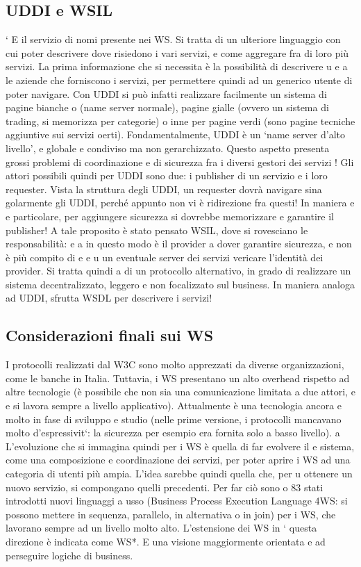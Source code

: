 \subsection{UDDI e WSIL}
`
E il servizio di nomi presente nei WS. Si tratta di un ulteriore linguaggio con
cui poter descrivere dove risiedono i vari servizi, e come aggregare fra di loro
più servizi. La prima informazione che si necessita è la possibilità di descrivere
u
e
a
le aziende che forniscono i servizi, per permettere quindi ad un generico utente
di poter navigare.
Con UDDI si può infatti realizzare facilmente un sistema di pagine bianche
o
(name server normale), pagine gialle (ovvero un sistema di trading, si memorizza per categorie) o inne per pagine verdi
(sono pagine tecniche aggiuntive
sui servizi oerti). Fondamentalmente, UDDI è un {`}name server d'alto livello',
e
globale e condiviso ma non gerarchizzato. Questo aspetto presenta grossi problemi di coordinazione e di sicurezza fra i
diversi gestori dei servizi !
Gli attori possibili quindi per UDDI sono due: i publisher di un servizio e i
loro requester. Vista la struttura degli UDDI, un requester dovrà navigare sina
golarmente gli UDDI, perché appunto non vi è ridirezione fra questi! In maniera
e
e
particolare, per aggiungere sicurezza si dovrebbe memorizzare e garantire il publisher!
A tale proposito è stato pensato WSIL, dove si rovesciano le responsabilità:
e
a
in questo modo è il provider a dover garantire sicurezza, e non è più compito di
e
e u
un eventuale server dei servizi vericare l'identità dei provider. Si tratta quindi
a
di un protocollo alternativo, in grado di realizzare un sistema decentralizzato,
leggero e non focalizzato sul business. In maniera analoga ad UDDI, sfrutta
WSDL per descrivere i servizi!
\subsection{Considerazioni finali sui WS}
I protocolli realizzati dal W3C sono molto apprezzati da diverse organizzazioni,
come le banche in Italia. Tuttavia, i WS presentano un alto overhead rispetto ad
altre tecnologie (è possibile che non sia una comunicazione limitata a due attori,
e
e si lavora sempre a livello applicativo). Attualmente è una tecnologia ancora
e
molto in fase di sviluppo e studio (nelle prime versione, i protocolli mancavano
molto d'espressivit`: la sicurezza per esempio era fornita solo a basso livello).
a
L'evoluzione che si immagina quindi per i WS è quella di far evolvere il
e
sistema, come una composizione e coordinazione dei servizi, per poter aprire i
WS ad una categoria di utenti più ampia. L'idea sarebbe quindi quella che, per
u
ottenere un nuovo servizio, si compongano quelli precedenti. Per far ciò sono
o
83
stati introdotti nuovi linguaggi a usso (Business Process Execution Language
4WS: si possono mettere in sequenza, parallelo, in alternativa o in join) per
i WS, che lavorano sempre ad un livello molto alto. L'estensione dei WS in
`
questa direzione è indicata come WS*. E una visione maggiormente orientata
e
ad perseguire logiche di business.
